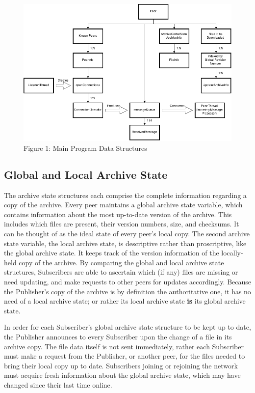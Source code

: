 \documentclass[12pt,a4paper,]{adreport}
\begin{document}
\begin{figure}[htbp]
\centering
\includegraphics{strucs.png}
\caption{Figure 1: Main Program Data Structures}
\end{figure}

\subsection{Global and Local Archive
State}\label{global-and-local-archive-state}

The archive state structures each comprise the complete information
regarding a copy of the archive. Every peer maintains a global archive
state variable, which contains information about the most up-to-date
version of the archive. This includes which files are present, their
version numbers, size, and checksums. It can be thought of as the ideal
state of every peer's local copy. The second archive state variable, the
local archive state, is descriptive rather than proscriptive, like the
global archive state. It keeps track of the version information of the
locally-held copy of the archive. By comparing the global and local
archive state structures, Subscribers are able to ascertain which (if
any) files are missing or need updating, and make requests to other
peers for updates accordingly. Because the Publisher's copy of the
archive is by definition the authoritative one, it has no need of a
local archive state; or rather its local archive state \textbf{is} its
global archive state.

In order for each Subscriber's global archive state structure to be kept
up to date, the Publisher announces to every Subscriber upon the change
of a file in its archive copy. The file data itself is not sent
immediately, rather each Subscriber must make a request from the
Publisher, or another peer, for the files needed to bring their local
copy up to date. Subscribers joining or rejoining the network must
acquire fresh information about the global archive state, which may have
changed since their last time online.
\end{document}
